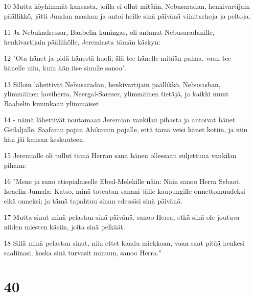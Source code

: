 \par 10 Mutta köyhimmät kansasta, joilla ei ollut mitään, Nebusaradan, henkivartijain päällikkö, jätti Juudan maahan ja antoi heille sinä päivänä viinitarhoja ja peltoja.
\par 11 Ja Nebukadressar, Baabelin kuningas, oli antanut Nebusaradanille, henkivartijain päällikölle, Jeremiasta tämän käskyn:
\par 12 "Ota hänet ja pidä hänestä huoli; älä tee hänelle mitään pahaa, vaan tee hänelle niin, kuin hän itse sinulle sanoo".
\par 13 Silloin lähettivät Nebusaradan, henkivartijain päällikkö, Nebusasban, ylimmäinen hoviherra, Neergal-Sareser, ylimmäinen tietäjä, ja kaikki muut Baabelin kuninkaan ylimmäiset
\par 14 - nämä lähettivät noutamaan Jeremian vankilan pihasta ja antoivat hänet Gedaljalle, Saafanin pojan Ahikamin pojalle, että tämä veisi hänet kotiin, ja niin hän jäi kansan keskuuteen.
\par 15 Jeremialle oli tullut tämä Herran sana hänen ollessaan suljettuna vankilan pihaan:
\par 16 "Mene ja sano etiopialaiselle Ebed-Melekille näin: Näin sanoo Herra Sebaot, Israelin Jumala: Katso, minä toteutan sanani tälle kaupungille onnettomuudeksi eikä onneksi; ja tämä tapahtuu sinun edessäsi sinä päivänä.
\par 17 Mutta sinut minä pelastan sinä päivänä, sanoo Herra, etkä sinä ole joutuva niiden miesten käsiin, joita sinä pelkäät.
\par 18 Sillä minä pelastan sinut, niin ettet kaadu miekkaan, vaan saat pitää henkesi saaliinasi, koska sinä turvasit minuun, sanoo Herra."

\chapter{40}

